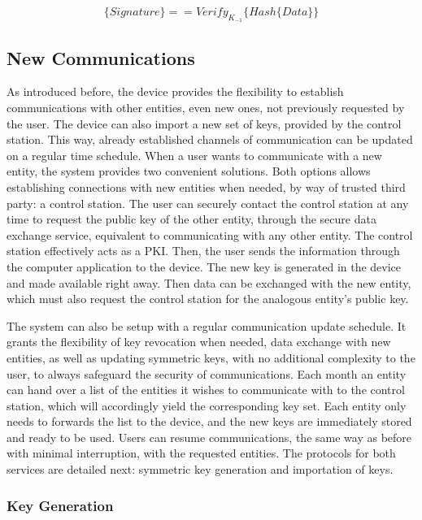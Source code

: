 \begin{equation}
	\label{eq:signature-verify}
	\{Signature\} == Verify_{K_{-1}}\{Hash\{Data\}\}
\end{equation}

\subsection{New Communications}\label{chap:arch:services:new-comms}

As introduced before, the device provides the flexibility to establish communications with other entities, even new ones, not previously requested by the user.
The device can also import a new set of keys, provided by the control station.
This way, already established channels of communication can be updated on a regular time schedule.
When a user wants to communicate with a new entity, the system provides two convenient solutions.
Both options allows establishing connections with new entities when needed, by way of trusted third party: a control station. 
The user can securely contact the control station at any time to request the public key of the other entity, through the secure data exchange service, equivalent to communicating with any other entity. The control station effectively acts as a PKI.
Then, the user sends the information through the computer application to the device. The new key is generated in the device and made available right away. Then data can be exchanged with the new entity, which must also request the control station for the analogous entity's public key.

The system can also be setup with a regular communication update schedule. It grants the flexibility of key revocation when needed, data exchange with new entities, as well as updating symmetric keys, with no additional complexity to the user, to always safeguard the security of communications.
Each month an entity can hand over a list of the entities it wishes to communicate with to the control station, which will accordingly yield the corresponding key set.
Each entity only needs to forwards the list to the device, and the new keys are immediately stored and ready to be used.
Users can resume communications, the same way as before with minimal interruption, with the requested entities.
The protocols for both services are detailed next: symmetric key generation and importation of keys.

\subsubsection{Key Generation}\label{chap:arch:services:new-comms:ecdh}

